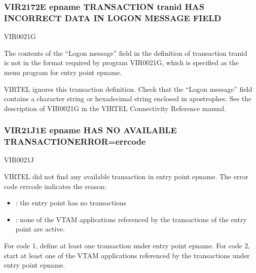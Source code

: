 \documentclass[letterpaper,10pt,english]{sphinxmanual}
\begin{document}
\subsubsection{VIR2172E epname TRANSACTION tranid HAS INCORRECT DATA IN LOGON MESSAGE FIELD}
\label{\detokenize{messages:vir2172e-epname-transaction-tranid-has-incorrect-data-in-logon-message-field}}\begin{description}
\sphinxAtStartPar
VIR0021G

\sphinxAtStartPar
The contents of the “Logon message” field in the definition of transaction tranid is not in the format required by program VIR0021G, which is specified as the menu program for entry point epname.

\sphinxAtStartPar
VIRTEL ignores this transaction definition. Check that the “Logon message” field contains a character string or hexadecimal string enclosed in apostrophes. See the description of VIR0021G in the VIRTEL Connectivity Reference manual.

\end{description}


\subsubsection{VIR21J1E epname HAS NO AVAILABLE TRANSACTION\sphinxhyphen{}ERROR=errcode}
\label{\detokenize{messages:vir21j1e-epname-has-no-available-transaction-error-errcode}}\begin{description}
\sphinxAtStartPar
VIR0021J

\sphinxAtStartPar
VIRTEL did not find any available transaction in entry point epname. The error code errcode indicates the reason:
\begin{itemize}
\item {} 
 : the entry point has no transactions

\item {} 
 : none of the VTAM applications referenced by the transactions of the entry point are active.

\end{itemize}

\sphinxAtStartPar
For code 1, define at least one transaction under entry point epname. For code 2, start at least one of the VTAM applications referenced by the transactions under entry point epname.

\end{description}
\end{document}
